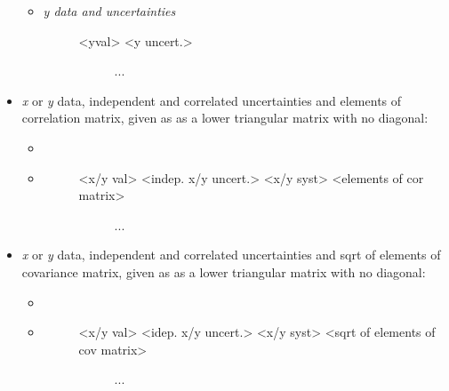 \documentclass[a4paper,10pt,english]{sphinxmanual}
\begin{document}
\begin{fulllineitems}
\begin{itemize}
\begin{itemize}
\begin{description}
\begin{description}
\end{description}

\end{description}

\item {} \begin{description}
\item[{     \emph{y data and uncertainties}}] \leavevmode\begin{description}
\item[{\textless{}yval\textgreater{}  \textless{}y uncert.\textgreater{}}] \leavevmode
...

\end{description}

\end{description}

\end{itemize}

\item {} 
\emph{x} or \emph{y} data, independent and correlated uncertainties and elements of
correlation matrix, given as as a lower triangular matrix with no
diagonal:
\begin{itemize}
\item {} 

\item {} \begin{description}
\item[{}] \leavevmode\begin{description}
\item[{\textless{}x/y val\textgreater{}  \textless{}indep. x/y uncert.\textgreater{}  \textless{}x/y syst\textgreater{}  \textless{}elements of cor matrix\textgreater{}}] \leavevmode
...

\end{description}

\end{description}

\end{itemize}

\item {} 
\emph{x} or \emph{y} data, independent and correlated uncertainties and sqrt of
elements of covariance matrix, given as as a lower triangular matrix
with no diagonal:
\begin{itemize}
\item {} 

\item {} \begin{description}
\item[{}] \leavevmode\begin{description}
\item[{\textless{}x/y val\textgreater{}  \textless{}idep. x/y uncert.\textgreater{}  \textless{}x/y syst\textgreater{}  \textless{}sqrt of elements of cov matrix\textgreater{}}] \leavevmode
...


\end{description}
\end{description}
\end{itemize}
\end{itemize}
\end{fulllineitems}
\end{document}
